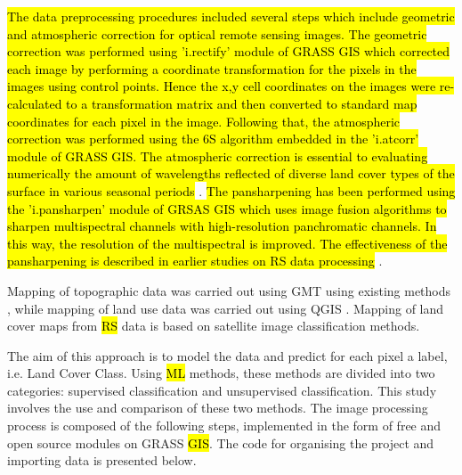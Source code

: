 \documentclass[geomatics,article,submit,pdftex,moreauthors]{Definitions/mdpi}
\begin{document}
\hl{The data preprocessing procedures included several steps which include geometric and atmospheric correction for optical remote sensing images. The geometric correction was performed using 'i.rectify' module of GRASS GIS which corrected each image by performing a coordinate transformation for the pixels in the images using control points. Hence the x,y cell coordinates on the images were re-calculated to a transformation matrix and then converted to standard map coordinates for each pixel in the image. Following that, the atmospheric correction was performed using the 6S algorithm embedded in the 'i.atcorr' module of GRASS GIS. The atmospheric correction is essential to evaluating numerically the amount of wavelengths reflected of diverse land cover types of the surface in various seasonal periods} \cite{f14071414,ABDELRAHMANHEGAB2024716}. \hl{The pansharpening has been performed using the 'i.pansharpen' module of GRSAS GIS which uses image fusion algorithms to sharpen multispectral channels with high-resolution panchromatic channels. In this way, the resolution of the multispectral is improved. The effectiveness of the pansharpening is described in earlier studies on RS data processing} \cite{rs15082017,rs13173433}.

Mapping of topographic data was carried out using GMT using existing methods \cite{Lemenkova202221,BECKER20051075,Lemenkova202217,10537274,5369602}, while mapping of land use data was carried out using QGIS \cite{FANG202031}. Mapping of land cover maps from \hl{RS} data is based on satellite image classification methods.

The aim of this approach is to model the data and predict for each pixel a label, i.e. Land Cover Class. Using \hl{ML} methods, these methods are divided into two categories: supervised classification and unsupervised classification. This study involves the use and comparison of these two methods. The image processing process is composed of the following steps, implemented in the form of free and open source modules on GRASS \hl{GIS}. The code for organising the project and importing data is presented below.
\end{document}
